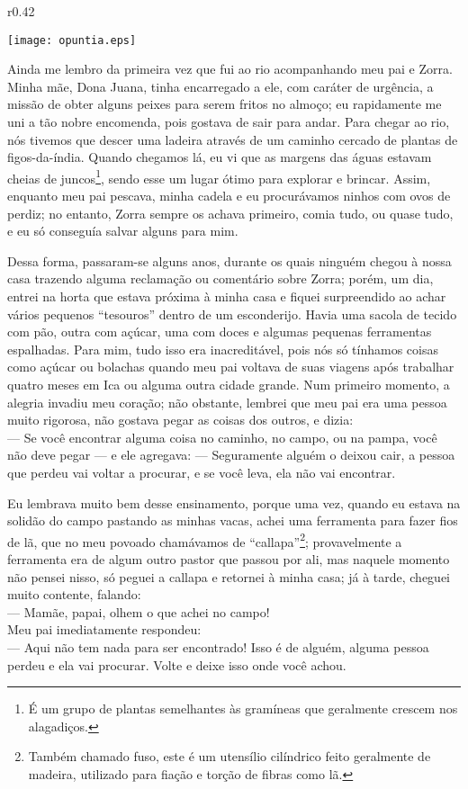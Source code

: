 \ifdefined\EnableIncludeImages
\begin{wrapfigure}{r}{0.42\textwidth}
  \begin{center}
  \vspace{-30pt}
    \texttt{[image: opuntia.eps]}
  \end{center}
  \vspace{-20pt}
\end{wrapfigure}
\fi
Ainda me lembro da primeira vez que fui ao rio acompanhando meu pai e Zorra. Minha mãe, Dona Juana, tinha encarregado a ele, com caráter de urgência, a missão de obter alguns peixes para serem fritos no almoço; eu rapidamente me uni a tão nobre encomenda, pois gostava de sair para andar. 
Para chegar ao rio, nós tivemos que descer uma ladeira através de um caminho cercado de plantas de figos-da-índia. Quando chegamos lá, eu vi que as margens das águas estavam cheias de juncos\footnote{É um grupo de plantas semelhantes às gramíneas que geralmente crescem nos alagadiços.}, sendo esse um lugar ótimo para explorar e brincar. Assim, enquanto meu pai pescava, minha cadela e eu procurávamos ninhos com ovos de perdiz; no entanto, Zorra sempre os achava primeiro, comia tudo, ou quase tudo, e eu só conseguía salvar alguns para mim.


Dessa forma, passaram-se alguns anos, durante os quais ninguém chegou à nossa casa trazendo alguma reclamação ou comentário sobre Zorra; porém, um dia, entrei na horta que estava próxima à minha casa e fiquei surpreendido ao achar vários pequenos ``tesouros'' dentro de um esconderijo. Havia uma sacola de tecido com pão, outra com açúcar, uma com doces e algumas pequenas ferramentas espalhadas. 
Para mim, tudo isso era inacreditável, pois nós só tínhamos coisas como açúcar ou bolachas quando meu pai voltava de suas viagens após trabalhar quatro meses em Ica ou alguma outra cidade grande.
Num primeiro momento, a alegria invadiu meu coração; não obstante, lembrei que meu pai era uma pessoa muito rigorosa, não gostava pegar as coisas dos outros, e dizia:\\\indent
--- Se você encontrar alguma coisa no caminho, no campo, ou na pampa, você não deve pegar ---
e ele agregava:
--- Seguramente alguém o deixou cair, a pessoa que perdeu vai voltar a procurar, e se você leva, ela não vai encontrar.

Eu lembrava muito bem desse ensinamento, porque uma vez, quando eu estava na solidão do campo pastando as minhas vacas, achei uma ferramenta para fazer fios de lã, que no meu povoado chamávamos de ``callapa''\footnote{Também chamado fuso, este é um utensílio cilíndrico feito geralmente de madeira, utilizado para fiação e torção de fibras como lã.}; provavelmente a ferramenta era de algum outro pastor que passou por ali, mas naquele momento não pensei nisso, só peguei a callapa e retornei à minha casa; já à tarde, cheguei  muito contente, falando:\\\indent
--- Mamãe, papai, olhem o que achei no campo!\\\indent
Meu pai imediatamente respondeu:\\\indent
--- Aqui não tem nada para ser encontrado! Isso é de alguém, alguma pessoa perdeu e ela vai procurar. Volte e deixe isso onde você achou.

